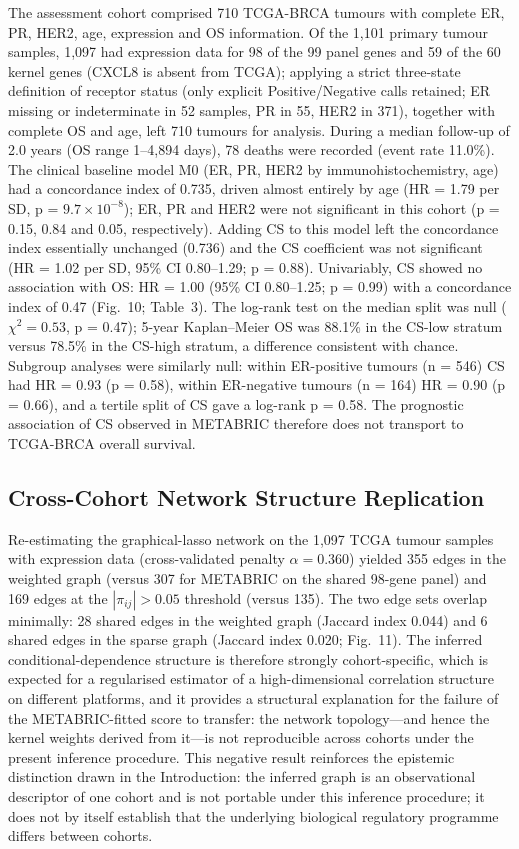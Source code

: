 \documentclass[12pt]{article}
\begin{document}
The assessment cohort comprised 710 TCGA-BRCA tumours with complete ER,
PR, HER2, age, expression and OS information. Of the 1,101 primary tumour
samples, 1,097 had expression data for 98 of the 99 panel genes and 59 of
the 60 kernel genes (CXCL8 is absent from TCGA); applying a strict
three-state definition of receptor status (only explicit Positive/Negative
calls retained; ER missing or indeterminate in 52 samples, PR in 55, HER2
in 371), together with complete OS and age, left 710 tumours for analysis.
During a median follow-up of 2.0 years (OS range 1--4,894 days), 78 deaths
were recorded (event rate 11.0\%). The clinical baseline model M0 (ER, PR,
HER2 by immunohistochemistry, age) had a concordance index of 0.735, driven
almost entirely by age (HR = 1.79 per SD, p = $9.7\times10^{-8}$); ER, PR
and HER2 were not significant in this cohort (p = 0.15, 0.84 and 0.05,
respectively). Adding CS to this model left the concordance index essentially
unchanged (0.736) and the CS coefficient was not significant (HR = 1.02 per
SD, 95\% CI 0.80--1.29; p = 0.88). Univariably, CS showed no association
with OS: HR = 1.00 (95\% CI 0.80--1.25; p = 0.99) with a concordance index
of 0.47 (Fig.~10; Table~3). The log-rank test on the median split was null
($\chi^2 = 0.53$, p = 0.47); 5-year Kaplan--Meier OS was 88.1\% in the
CS-low stratum versus 78.5\% in the CS-high stratum, a difference consistent
with chance. Subgroup analyses were similarly null: within ER-positive
tumours (n = 546) CS had HR = 0.93 (p = 0.58), within ER-negative tumours
(n = 164) HR = 0.90 (p = 0.66), and a tertile split of CS gave a log-rank
p = 0.58. The prognostic association of CS observed in METABRIC therefore
does not transport to TCGA-BRCA overall survival.

\subsection{Cross-Cohort Network Structure Replication}

Re-estimating the graphical-lasso network on the 1,097 TCGA tumour samples
with expression data (cross-validated penalty $\alpha = 0.360$) yielded 355
edges in the weighted graph (versus 307 for METABRIC on the shared 98-gene
panel) and 169 edges at the $|\pi_{ij}| > 0.05$ threshold (versus 135). The
two edge sets overlap minimally: 28 shared edges in the weighted graph
(Jaccard index 0.044) and 6 shared edges in the sparse graph (Jaccard index
0.020; Fig.~11). The inferred conditional-dependence structure is therefore
strongly cohort-specific, which is expected for a regularised estimator of a
high-dimensional correlation structure on different platforms, and it
provides a structural explanation for the failure of the METABRIC-fitted
score to transfer: the network topology---and hence the kernel weights
derived from it---is not reproducible across cohorts under the present
inference procedure. This negative result reinforces the epistemic
distinction drawn in the Introduction: the inferred graph is an
observational descriptor of one cohort and is not portable under this
inference procedure; it does not by itself establish that the underlying
biological regulatory programme differs between cohorts.
\end{document}
